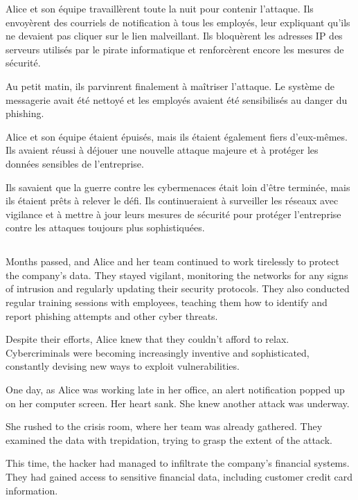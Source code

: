 \documentclass{./StyCls/MyArticle}
\begin{document}
Alice et son équipe travaillèrent toute la nuit pour contenir l'attaque. Ils envoyèrent des courriels de notification à tous les employés, leur expliquant qu'ils ne devaient pas cliquer sur le lien malveillant. Ils bloquèrent les adresses IP des serveurs utilisés par le pirate informatique et renforcèrent encore les mesures de sécurité.

Au petit matin, ils parvinrent finalement à maîtriser l'attaque. Le système de messagerie avait été nettoyé et les employés avaient été sensibilisés au danger du phishing.

Alice et son équipe étaient épuisés, mais ils étaient également fiers d'eux-mêmes. Ils avaient réussi à déjouer une nouvelle attaque majeure et à protéger les données sensibles de l'entreprise.

Ils savaient que la guerre contre les cybermenaces était loin d'être terminée, mais ils étaient prêts à relever le défi. Ils continueraient à surveiller les réseaux avec vigilance et à mettre à jour leurs mesures de sécurité pour protéger l'entreprise contre les attaques toujours plus sophistiquées.

\subsection{}

Months passed, and Alice and her team continued to work tirelessly to protect the company's data. They stayed vigilant, monitoring the networks for any signs of intrusion and regularly updating their security protocols. They also conducted regular training sessions with employees, teaching them how to identify and report phishing attempts and other cyber threats.

Despite their efforts, Alice knew that they couldn't afford to relax. Cybercriminals were becoming increasingly inventive and sophisticated, constantly devising new ways to exploit vulnerabilities.

One day, as Alice was working late in her office, an alert notification popped up on her computer screen. Her heart sank. She knew another attack was underway.

She rushed to the crisis room, where her team was already gathered. They examined the data with trepidation, trying to grasp the extent of the attack.

This time, the hacker had managed to infiltrate the company's financial systems. They had gained access to sensitive financial data, including customer credit card information.
\end{document}
